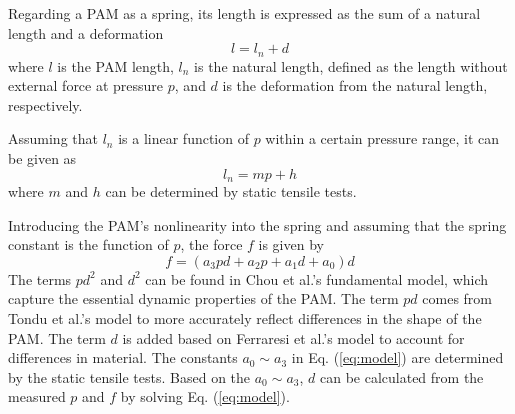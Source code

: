 Regarding a PAM as a spring\cite{spring}, its length is expressed as the sum of a natural length and a deformation 
\begin{equation}
   l = l_n + d
\label{eq:estimation}
\end{equation}
where $l$ is the PAM length, $l_n$ is the natural length, defined as the length without external force at pressure $p$, and $d$ is the deformation from the natural length, respectively.
 
Assuming that $l_n$ is a linear function of $p$ within a certain pressure range, it can be given as 
\begin{equation}
l_n = mp + h
\label{eq:L_n}
\end{equation}
where $m$ and $h$ can be determined by static tensile tests.
 
Introducing the PAM's nonlinearity into the spring and assuming that the spring constant is the function of $p$\cite{spring}, the force $f$ is given by
\begin{equation}
\label{eq:model}
f = (a_3pd + a_2p + a_1d + a_0)d
\end{equation}
The terms $pd^2$ and $d^2$ can be found in Chou et al.'s fundamental model\cite{chouMeasurementModelingMcKibben1996}, which capture the essential dynamic properties of the PAM. The term $pd$  comes from Tondu et al.'s model\cite{ModelingControl} to more accurately reflect differences in the shape of the PAM. The term $d$ is added based on Ferraresi et al.'s model\cite{Comparison} to account for differences in material. The constants $a_0 \sim a_3$ in Eq. (\ref{eq:model}) are determined by the static tensile tests. Based on the $a_0 \sim a_3$, $d$  can be calculated from the measured $p$ and $f$ by solving Eq. (\ref{eq:model}).




%


